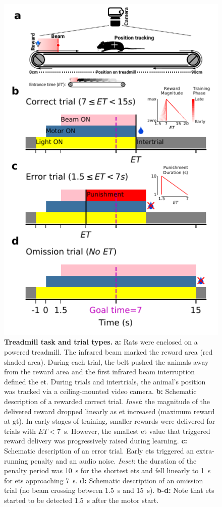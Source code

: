 \begin{figure}[bt!]
  \begin{center}
    \includegraphics[width=.5\linewidth]{ch-methods/figures/TaskRulesFULL.pdf}
    \caption[Treadmill task and trial types]
        {\textbf{Treadmill task and trial types.}
        \textbf{a:}
        Rats were enclosed on a powered treadmill. 
        The infrared beam marked the reward area (red shaded area).
        During each trial, the belt pushed the animals away from the reward area and the first infrared beam interruption defined the \gls{et}.
        During trials and intertrials, the animal's position was tracked via a ceiling-mounted video camera.
        \textbf{b:}
        Schematic description of a rewarded correct trial.
            \textit{Inset}: the magnitude of the delivered reward dropped linearly as \gls{et} increased (maximum reward at \acrlong{gt}).
            In early stages of training, smaller rewards were delivered for trials with $ET<7$~s.
            However, the smallest \gls{et} value that triggered reward delivery was progressively raised during learning.
        \textbf{c:}
        Schematic description of an error trial.
        Early \glspl{et} triggered an extra-running penalty and an audio noise.
            \textit{Inset}: the duration of the penalty period was 10~s for the shortest \glspl{et} and fell linearly to 1~s for \glspl{et} approaching 7~s.
        \textbf{d:}
        Schematic description of an omission trial (no beam crossing between 1.5~s and 15~s).
        \textbf{b-d:}
        Note that \glspl{et} started to be detected 1.5~s after the motor start. 
    }
    \label{fig:methods:taskRules}
  \end{center}
\end{figure}